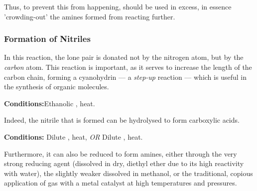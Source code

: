 				Thus, to prevent this from happening,  should be used in excess, in essence 'crowding-out' the amines formed
				from reacting further.




			\pagebreak
			\subsubsection{Formation of Nitriles}

				In this reaction, the lone pair is donated not by the nitrogen atom, but by the \textit{carbon} atom. This reaction is
				important, as it serves to increase the length of the carbon chain, forming a cyanohydrin –– a \textit{step-up}
				reaction –– which is useful in the synthesis of organic molecules.

				\vspace{1.5em}
				\vbox{\textbf{Conditions:}\tabto{35mm}Ethanolic , heat.}




				\hypertarget{NitrileUses}{}
				Indeed, the nitrile that is formed can be hydrolysed to form carboxylic acids.

				\vspace{1.5em}
				\vbox{\textbf{Conditions:}	\tabto{35mm}Dilute , heat, \textit{OR}
											\tabto{35mm}Dilute , heat.}



				Furthermore, it can also be reduced to form amines, either through the very strong reducing agent 
				(dissolved in dry, diethyl ether due to its high reactivity with water), the slightly weaker  dissolved in
				methanol, or the traditional, copious application of  gas with a metal catalyst at high temperatures and pressures.

